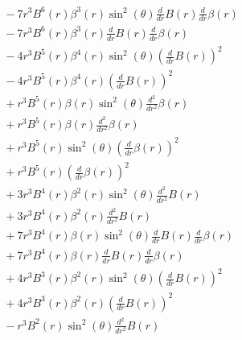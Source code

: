 \documentclass[11pt,a4paper]{article}
\begin{document}
\begin{align*}
  &\quad - 7 r^{3} B^{6}{\left(r \right)} \beta^{3}{\left(r \right)} \sin^{2}{\left(\theta \right)} \frac{d}{d r} B{\left(r \right)} \frac{d}{d r} \beta{\left(r \right)} \\
  &\quad - 7 r^{3} B^{6}{\left(r \right)} \beta^{3}{\left(r \right)} \frac{d}{d r} B{\left(r \right)} \frac{d}{d r} \beta{\left(r \right)} \\
  &\quad - 4 r^{3} B^{5}{\left(r \right)} \beta^{4}{\left(r \right)} \sin^{2}{\left(\theta \right)} \left(\frac{d}{d r} B{\left(r \right)}\right)^{2} \\
  &\quad - 4 r^{3} B^{5}{\left(r \right)} \beta^{4}{\left(r \right)} \left(\frac{d}{d r} B{\left(r \right)}\right)^{2} \\
  &\quad + r^{3} B^{5}{\left(r \right)} \beta{\left(r \right)} \sin^{2}{\left(\theta \right)} \frac{d^{2}}{d r^{2}} \beta{\left(r \right)} \\
  &\quad + r^{3} B^{5}{\left(r \right)} \beta{\left(r \right)} \frac{d^{2}}{d r^{2}} \beta{\left(r \right)} \\
  &\quad + r^{3} B^{5}{\left(r \right)} \sin^{2}{\left(\theta \right)} \left(\frac{d}{d r} \beta{\left(r \right)}\right)^{2} \\
  &\quad + r^{3} B^{5}{\left(r \right)} \left(\frac{d}{d r} \beta{\left(r \right)}\right)^{2} \\
  &\quad + 3 r^{3} B^{4}{\left(r \right)} \beta^{2}{\left(r \right)} \sin^{2}{\left(\theta \right)} \frac{d^{2}}{d r^{2}} B{\left(r \right)} \\
  &\quad + 3 r^{3} B^{4}{\left(r \right)} \beta^{2}{\left(r \right)} \frac{d^{2}}{d r^{2}} B{\left(r \right)} \\
  &\quad + 7 r^{3} B^{4}{\left(r \right)} \beta{\left(r \right)} \sin^{2}{\left(\theta \right)} \frac{d}{d r} B{\left(r \right)} \frac{d}{d r} \beta{\left(r \right)} \\
  &\quad + 7 r^{3} B^{4}{\left(r \right)} \beta{\left(r \right)} \frac{d}{d r} B{\left(r \right)} \frac{d}{d r} \beta{\left(r \right)} \\
  &\quad + 4 r^{3} B^{3}{\left(r \right)} \beta^{2}{\left(r \right)} \sin^{2}{\left(\theta \right)} \left(\frac{d}{d r} B{\left(r \right)}\right)^{2} \\
  &\quad + 4 r^{3} B^{3}{\left(r \right)} \beta^{2}{\left(r \right)} \left(\frac{d}{d r} B{\left(r \right)}\right)^{2} \\
  &\quad - r^{3} B^{2}{\left(r \right)} \sin^{2}{\left(\theta \right)} \frac{d^{2}}{d r^{2}} B{\left(r \right)} \\

\end{align*}
\end{document}

